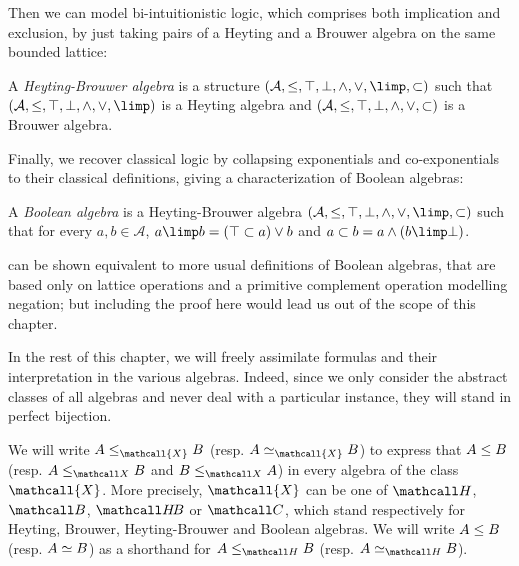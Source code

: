 Then we can model bi-intuitionistic logic, which comprises both implication and
exclusion, by just taking pairs of a Heyting and a Brouwer algebra on the same
bounded lattice:

\begin{definition}
  A \emph{Heyting-Brouwer algebra} is a structure $(\mathcal{A}, \sement, \ltop,
  \lbot, \lmeet, \ljoin, \lexp, \lcoexp)$ such that $(\mathcal{A}, \sement,
  \ltop, \lbot, \lmeet, \ljoin, \lexp)$ is a Heyting algebra and $(\mathcal{A},
  \leq, \top, \bot, \land, \lor, \subset)$ is a Brouwer algebra.
\end{definition}

Finally, we recover classical logic by collapsing exponentials and
co-exponentials to their classical definitions, giving a characterization of
Boolean algebras:

\begin{definition}
  A \emph{Boolean algebra} is a Heyting-Brouwer algebra $(\mathcal{A}, \sement,
  \ltop, \lbot, \lmeet, \ljoin, \lexp, \lcoexp)$ such that for every $a, b \in
  \mathcal{A}$, $a \lexp b = (\ltop \lcoexp a) \ljoin b$ and $a \lcoexp b = a
  \lmeet (b \lexp \bot)$.
\end{definition}

\begin{remark}
 can be shown equivalent to more
usual definitions of Boolean algebras, that are based only on lattice operations
and a primitive complement operation modelling negation; but including the proof
here would lead us out of the scope of this chapter.
\end{remark}

In the rest of this chapter, we will freely assimilate formulas and their
interpretation in the various algebras. Indeed, since we only consider the
abstract classes of all algebras and never deal with a particular instance,
they will stand in perfect bijection.

\begin{definition}
  We will write $A \sement_{\mathcall{X}} B$ (resp. $A \semequiv_{\mathcall{X}}
  B$) to express that $A \leq B$ (resp. $A \sementX B$ and $B \sementX A$) in
  every algebra of the class $\mathcall{X}$. More precisely, $\mathcall{X}$ can
  be one of $\Heyting$, $\Brouwer$, $\HeytingBrouwer$ or $\Boolean$, which stand
  respectively for Heyting, Brouwer, Heyting-Brouwer and Boolean algebras. We
  will write $A \leq B$ (resp. $A \simeq B$) as a shorthand for $A
  \sementH B$ (resp. $A \semequiv_{\Heyting} B$).
\end{definition}

